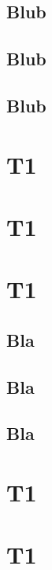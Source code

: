 \blindtext
\subsection{Blub}
\blindtext

\subsection{Blub}
\blindtext

\subsection{Blub}
\blindtext

\section{T1}
\section{T1}

\blindtext

\section{T1}

\blindtext

\subsection{Bla}
\blindtext

\subsection{Bla}

\blindtext

\subsection{Bla}
\blindtext

\section{T1}
\blindtext

\section{T1}
\blindtext


